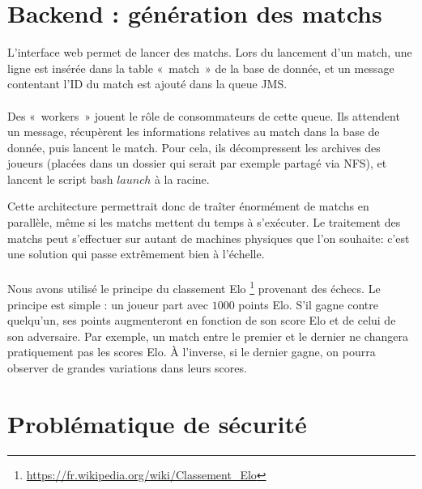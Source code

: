 \documentclass[10pt]{scrartcl}
\begin{document}
\section{Backend : génération des matchs}
  L'interface web permet de lancer des matchs. Lors du lancement d'un
  match, une ligne est insérée dans la table «~match~» de la base de
  donnée, et un message contentant l'ID du match est ajouté dans la
  queue JMS.

  \paragraph{}
  Des «~workers~» jouent le rôle de consommateurs de cette queue. Ils
  attendent un message, récupèrent les informations relatives au match
  dans la base de donnée, puis lancent le match. Pour cela, ils décompressent
  les archives des joueurs (placées dans un dossier qui serait par exemple partagé
  via NFS), et lancent le script bash $launch$ à la racine.

  Cette architecture permettrait donc de traîter énormément de matchs en parallèle,
  même si les matchs mettent du temps à s'exécuter. Le traitement des matchs peut
  s'effectuer sur autant de machines physiques que l'on souhaite: c'est une solution
  qui passe extrêmement bien à l'échelle.

  \paragraph{}
  Nous avons utilisé le principe du classement Elo
  \footnote{\url{https://fr.wikipedia.org/wiki/Classement\_Elo}} provenant
  des échecs. Le principe est simple : un joueur part avec $1000$ points Elo.
  S'il gagne contre quelqu'un, ses points augmenteront en fonction de son
  score Elo et de celui de son adversaire. Par exemple, un match entre le
  premier et le dernier ne changera pratiquement pas les scores Elo. À l'inverse,
  si le dernier gagne, on pourra observer de grandes variations dans leurs scores.

\section{Problématique de sécurité}
\end{document}
